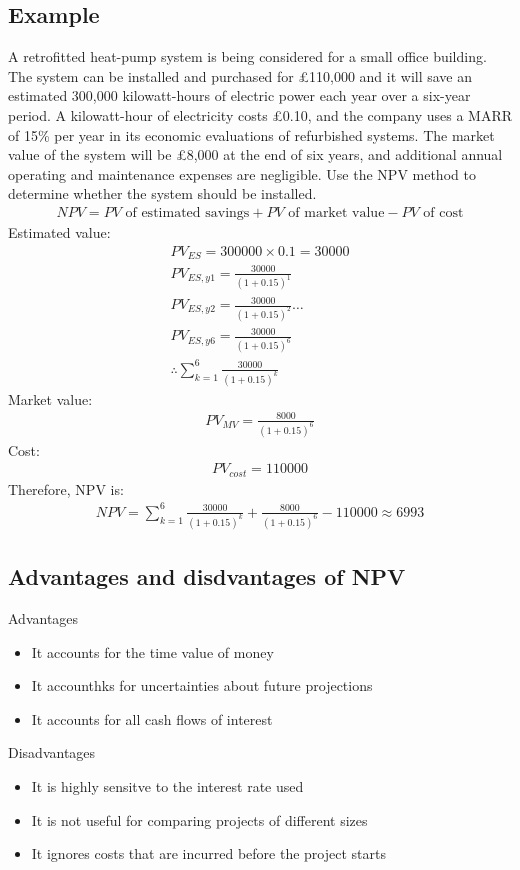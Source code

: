 \documentclass[class=report, crop=false, 12pt,a4paper]{standalone}
\begin{document}
\subsection{Example}
A retrofitted heat-pump system is being considered for a small office building. The system can be installed and purchased for £110,000 and it will save an estimated 300,000 kilowatt-hours of electric power each year over a six-year period. A kilowatt-hour of electricity costs £0.10, and the company uses a MARR of 15\% per year in its economic evaluations of refurbished systems. The market value of the system will be £8,000 at the end of six years, and additional annual operating and maintenance expenses are negligible. Use the NPV method to determine whether the system should be installed. 
\begin{gather}
	NPV = PV\textrm{ of estimated savings} + PV\textrm{ of market value} -PV\textrm{ of cost}
\end{gather}
Estimated value:
\begin{gather}
	PV_{ES} = 300000\times 0.1 = 30000\\
	PV_{ES,y1} = \frac{30000}{(1+0.15)^1}\\
	PV_{ES,y2} = \frac{30000}{(1+0.15)^2}\dots\\
	PV_{ES,y6} = \frac{30000}{(1+0.15)^6} \\
	\therefore\sum_{k=1}^6\frac{30000}{(1+0.15)^k}
\end{gather}
Market value:
\begin{gather}
	PV_{MV} = \frac{8000}{(1+0.15)^6}
\end{gather}
Cost:
\begin{gather}
	PV_{cost} = 110000
\end{gather}
Therefore, NPV is:
\begin{gather}
	NPV = \sum_{k=1}^6\frac{30000}{(1+0.15)^k} +\frac{8000}{(1+0.15)^6} - 110000 \approx 6993
\end{gather}
\subsection{Advantages and disdvantages of NPV}
Advantages
\begin{itemize}
	\item It accounts for the time value of money
	\item It accounthks for uncertainties about future projections
	\item It accounts for all cash flows of interest
\end{itemize}
Disadvantages
\begin{itemize}
	\item It is highly sensitve to the interest rate used
	\item It is not useful for comparing projects of different sizes
	\item It ignores costs that are incurred before the project starts
\end{itemize}
\end{document}
